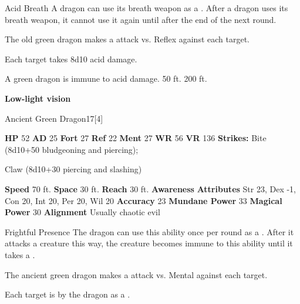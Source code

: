     \begin{freeability}{Acid Breath}
      A dragon can use its breath weapon as a .
      After a dragon uses its breath weapon, it cannot use it again until after the end of the next round.
      \par The old green dragon makes a  attack
        vs. Reflex against each target.
    
    \hit Each target takes 8d10 acid damage.
    \end{freeability}
  
      
       A green dragon is immune to acid damage.
     50 ft.
     200 ft.
    \par\noindent\textbf{Low-light vision}
  

  \begin{monsubsection}{Ancient Green Dragon}{17}[4]
    \vspace{-1em}\vspace{-1em}
    \vspace{0em}

    
    

    \begin{spellcontent}
      \begin{spelltargetinginfo}
        \pari \textbf{HP} 52 \monsep
          \textbf{AD} 25 \monsep
          \textbf{Fort} 27 \monsep
          \textbf{Ref} 22 \monsep
          \textbf{Ment} 27
        \pari \textbf{WR} 56 \monsep
        \textbf{VR} 136
        \pari \textbf{Strikes:}
            Bite  (8d10+50 bludgeoning and piercing);
\par Claw  (8d10+30 piercing and slashing)
      \end{spelltargetinginfo}
    \end{spellcontent}
    \begin{monsterfooter}
      \pari \textbf{Speed} 70 ft. \monsep
        \textbf{Space} 30 ft. \monsep
        \textbf{Reach} 30 ft.
      \pari \textbf{Awareness} 
      \pari \textbf{Attributes}
        Str 23, Dex -1,
        Con 20, Int 20,
        Per 20, Wil 20
      \pari \textbf{Accuracy} 23 \monsep
        \textbf{Mundane Power} 33 \monsep
      \textbf{Magical Power} 30
      \pari \textbf{Alignment} Usually chaotic evil
    \end{monsterfooter}
  \end{monsubsection}
  \begin{freeability}{Frightful Presence}
      The dragon can use this ability once per round as a .
      After it attacks a creature this way, the creature becomes immune to this ability until it takes a .
      \par The ancient green dragon makes a  attack
        vs. Mental against each target.
    
    \hit Each target is  by the dragon as a .
    \end{freeability}
  

